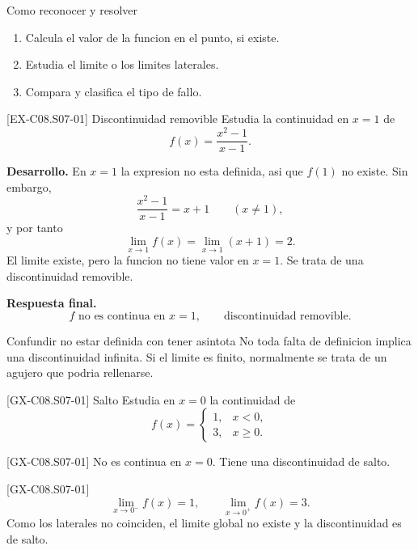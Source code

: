 \begin{methodbox}{Como reconocer y resolver}
\begin{enumerate}
  \item Calcula el valor de la funcion en el punto, si existe.
  \item Estudia el limite o los limites laterales.
  \item Compara y clasifica el tipo de fallo.
\end{enumerate}
\end{methodbox}

\begin{solvedexample}{[EX-C08.S07-01] Discontinuidad removible}
Estudia la continuidad en \(x=1\) de
\[
f(x)=\frac{x^2-1}{x-1}.
\]

\textbf{Desarrollo.} En \(x=1\) la expresion no esta definida, asi que \(f(1)\) no existe.
Sin embargo,
\[
\frac{x^2-1}{x-1}=x+1\qquad (x\neq 1),
\]
y por tanto
\[
\lim_{x\to 1}f(x)=\lim_{x\to 1}(x+1)=2.
\]
El limite existe, pero la funcion no tiene valor en \(x=1\). Se trata de una discontinuidad
removible.

\textbf{Respuesta final.}
\[
f \text{ no es continua en }x=1,\qquad \text{discontinuidad removible}.
\]
\end{solvedexample}

\begin{commonerror}{Confundir no estar definida con tener asintota}
No toda falta de definicion implica una discontinuidad infinita. Si el limite es finito,
normalmente se trata de un agujero que podria rellenarse.
\end{commonerror}

\begin{guidedexercise}{[GX-C08.S07-01] Salto}
Estudia en \(x=0\) la continuidad de
\[
f(x)=
\begin{cases}
1,& x<0,\\
3,& x\geq 0.
\end{cases}
\]
\end{guidedexercise}

\begin{shortanswer}{[GX-C08.S07-01]}
No es continua en \(x=0\). Tiene una discontinuidad de salto.
\end{shortanswer}

\begin{fullsolution}{[GX-C08.S07-01]}
\[
\lim_{x\to 0^-}f(x)=1,\qquad \lim_{x\to 0^+}f(x)=3.
\]
Como los laterales no coinciden, el limite global no existe y la discontinuidad es de salto.
\end{fullsolution}


